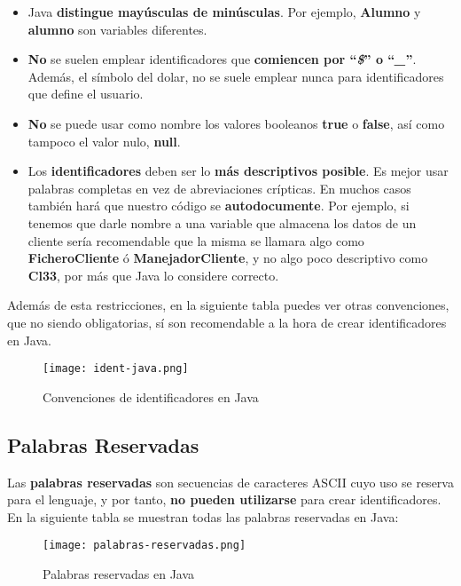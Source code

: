 \begin{itemize}
    \item Java \textbf{distingue mayúsculas de minúsculas}. Por ejemplo, \textbf{Alumno} y \textbf{alumno} son variables diferentes.

    \item \textbf{No} se suelen emplear identificadores que \textbf{comiencen por ``\textit{\$}'' o ``\textit{\_}''}. Además, el símbolo del dolar, no se suele emplear nunca para identificadores que define el usuario.

    \item \textbf{No} se puede usar como nombre los valores booleanos \textbf{true} o \textbf{false}, así como tampoco el valor nulo, \textbf{null}.

    \item Los \textbf{identificadores} deben ser lo \textbf{más descriptivos posible}. Es mejor usar palabras completas en vez de abreviaciones crípticas. En muchos casos también hará que nuestro código se \textbf{autodocumente}. Por ejemplo, si tenemos que darle nombre a una variable que almacena los datos de un cliente sería recomendable que la misma se llamara algo como \textbf{FicheroCliente} ó \textbf{ManejadorCliente}, y no algo poco descriptivo como \textbf{Cl33}, por más que Java lo considere correcto.
\end{itemize}

Además de esta restricciones, en la siguiente tabla puedes ver otras convenciones, que no siendo obligatorias, sí son recomendable a la hora de crear identificadores en Java.

\begin{figure}[H]
    \centering
    \texttt{[image: ident-java.png]}
    \caption{Convenciones de identificadores en Java}
\end{figure}

\subsection{Palabras Reservadas}
Las \textbf{palabras reservadas} son secuencias de caracteres ASCII cuyo uso se reserva para el lenguaje, y por tanto, \textbf{no pueden utilizarse} para crear identificadores. En la siguiente tabla se muestran todas las palabras reservadas en Java:

\begin{figure}[H]
    \centering
    \texttt{[image: palabras-reservadas.png]}
    \caption{Palabras reservadas en Java}
\end{figure}

